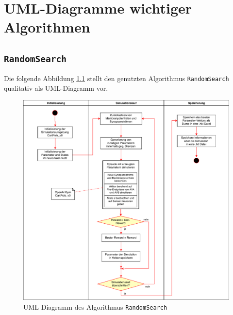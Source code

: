 \appendix
%
\chapter{UML-Diagramme wichtiger Algorithmen}
\label{app:UML}
%

	\section{\texttt{RandomSearch}}
	\label{app:UML_RS}
		Die folgende Abbildung \ref{fig:uml_rs} stellt den genutzten Algorithmus \texttt{RandomSearch} qualitativ als UML-Diagramm vor.
		\begin{figure}[H]
			\centering
			\includegraphics[width=14cm]{figures/appendix/uml_rs.pdf}
			\caption{UML Diagramm des Algorithmus \texttt{RandomSearch}}
			\label{fig:uml_rs}
		\end{figure}
	
